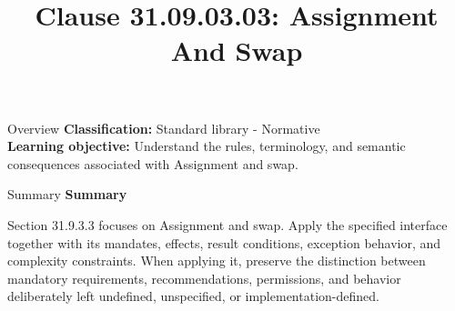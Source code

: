 \documentclass[10pt,letterpaper]{article}
\title{Clause 31.09.03.03: Assignment And Swap}
\author{}
\date{}
\begin{document}
\maketitle
\begin{CornellOverviewBox}{Overview}
\textbf{Classification:} Standard library - Normative\\[2pt]
\textbf{Learning objective:} Understand the rules, terminology, and semantic consequences associated with Assignment and swap.
\end{CornellOverviewBox}\begin{CornellSummaryBox}{Summary}
{\sffamily\bfseries\color{Accent} Summary}\par\vspace{3pt}Section 31.9.3.3 focuses on Assignment and swap. Apply the specified interface together with its mandates, effects, result conditions, exception behavior, and complexity constraints. When applying it, preserve the distinction between mandatory requirements, recommendations, permissions, and behavior deliberately left undefined, unspecified, or implementation-defined.
\end{CornellSummaryBox}
\end{document}
